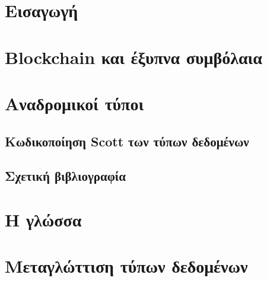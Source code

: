 \documentclass[diploma]{softlab-thesis}
\begin{document}

\tableofcontents
\listoffigures



\mainmatter




\chapter{Εισαγωγή}
\label{chap:chapter1}



\chapter{Blockchain και έξυπνα συμβόλαια}
\label{chap:chapter2}



\chapter{Αναδρομικοί τύποι}
\label{chap:chapter3}





\section{Κωδικοποίηση Scott των τύπων δεδομένων}
\label{sec:data-encoding}


\section{Σχετική βιβλιογραφία}



\chapter{Η γλώσσα \FIR{}}
\label{chap:chapter4}








\chapter{Μεταγλώττιση τύπων δεδομένων}
\label{chap:chapter5}
\end{document}
